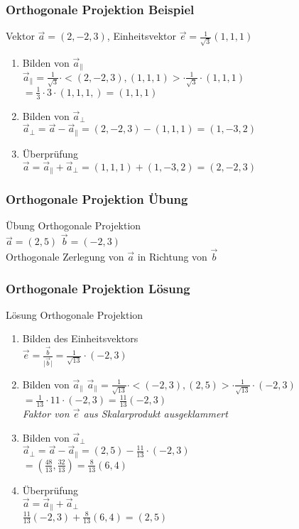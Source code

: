 \begin{frame}
	\frametitle{Orthogonale Projektion Beispiel}
	Vektor $\vec{a} = (2, -2, 3)$, Einheitsvektor $\vec{e} = \frac{1}{\sqrt{3}}(1, 1, 1)$\\

    \begin{enumerate}
        \item Bilden von $\vec{a}_{\parallel}$\\
        $\vec{a}_{\parallel} = \frac{1}{\sqrt{3}} \cdot <(2, -2, 3), (1, 1, 1)> \cdot \frac{1}{\sqrt{3}} \cdot (1, 1, 1)$
        $= \frac{1}{3} \cdot 3 \cdot (1, 1, 1,) = (1, 1, 1)$
        \item Bilden von $\vec{a}_{\perp}$\\
        $\vec{a}_{\perp} = \vec{a} - \vec{a}_{\parallel} = (2, -2, 3) - (1, 1, 1) = (1, -3 , 2)$
        \item Überprüfung\\
        $\vec{a} = \vec{a}_{\parallel} + \vec{a}_{\perp} = (1, 1, 1) + (1, -3, 2) = (2, -2, 3)$
    \end{enumerate}
\end{frame}
	

\begin{frame}
	\frametitle{Orthogonale Projektion Übung}
	Übung Orthogonale Projektion \\
	$\vec{a} = (2, 5)$ $\vec{b} = (-2, 3)$\\
	Orthogonale Zerlegung von $\vec{a}$ in Richtung von $\vec{b}$
\end{frame}


\begin{frame}
	\frametitle{Orthogonale Projektion Lösung}
	Lösung Orthogonale Projektion\\
    \begin{enumerate}
        \item Bilden des Einheitsvektors \\
        $\vec{e} = \frac{\vec{b}}{\lvert \vec{b} \rvert} = \frac{1}{\sqrt{13}} \cdot (-2, 3)$\\
        \item Bilden von $\vec{a}_{\parallel}$
        $\vec{a}_{\parallel} = \frac{1}{\sqrt{13}} \cdot <(-2, 3), (2, 5)> \cdot \frac{1}{\sqrt{13}} \cdot (-2, 3)$ \\
        $= \frac{1}{13} \cdot 11 \cdot (-2, 3) = \frac{11}{13}(-2, 3)$\\
        \textit{Faktor von $\vec{e}$  aus Skalarprodukt ausgeklammert}\\
        \item Bilden von $\vec{a}_{\perp}$ \\
        $\vec{a}_{\perp} = \vec{a} - \vec{a}_{\parallel} = (2, 5) - \frac{11}{13} \cdot (-2, 3)$\\
        $= (\frac{48}{13}, \frac{32}{13}) = \frac{8}{13}(6, 4)$\\
        \item Überprüfung \\
        $\vec{a} = \vec{a}_{\parallel} + \vec{a}_{\perp}$\\
        $\frac{11}{13}(-2, 3) + \frac{8}{13}(6, 4) = (2, 5)$ \\
    \end{enumerate}
\end{frame}
